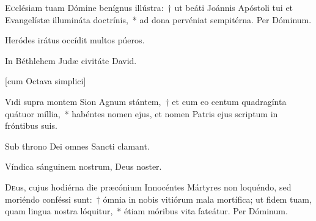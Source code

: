 \documentclass[vesperale_romanum.tex]{subfiles}
\begin{document}
\admagnificat


\oratio \label{oratio_s_joannis_dec_27}

\lettrine{E}{c}clésiam tuam Dómine benígnus illústra:~† ut beáti Joánnis Apóstoli tui et Evangelístæ illumináta doctrínis,~* ad dona pervéniat sempitérna.
Per Dóminum.



\vv Heródes irátus occídit multos púeros.

\rr In Béthlehem Judæ civitáte David.



 \label{dec_28}


[cum Octava simplici]


\lettrine{V}{i}di supra montem Sion Agnum stántem,~† et cum eo centum quadragínta quátuor míllia,~* habéntes nomen ejus, et nomen Patris ejus scriptum in fróntibus suis.

\hymnus


\vv Sub throno Dei omnes Sancti clamant.

\rr Víndica sánguinem nostrum, Deus noster.

\admagnificat


\oratio \label{oratio_28_dec}

\lettrine{D}{e}us, cujus hodiérna die præcónium Innocéntes Mártyres non loquéndo, sed moriéndo conféssi sunt:~† ómnia in nobis vitiórum mala mortífica; ut fidem tuam, quam lingua nostra lóquitur,~* étiam móribus vita fateátur. Per Dóminum.

\end{document}
